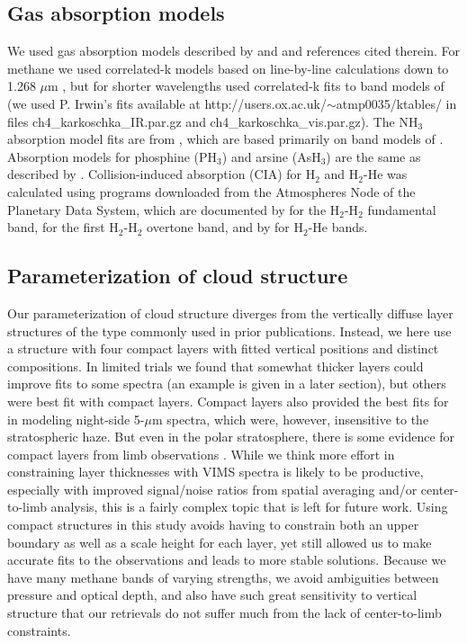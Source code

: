 \documentclass[article,11pt]{emulateapj}
\def\mum{$\mu$m }
\def\phtx{PH$_3$}
\def\nht{NH$_3$ }
\begin{document}
\subsection{Gas absorption models}
We used gas absorption models 
 described by \cite{Sro2018dark} and \cite{Sro2013gws}  and references cited therein.  For
methane we used correlated-k models
based on line-by-line calculations down to 1.268 \mum
\citep{Sro2012LBL}, but for shorter wavelengths used correlated-k fits
to band models of \cite{Kark2010ch4} (we used P. Irwin's fits
available at http://users.ox.ac.uk/$\sim$atmp0035/ktables/ in files
ch4\_karkoschka\_IR.par.gz and ch4\_karkoschka\_vis.par.gz).  The \nht
absorption model fits are from \cite{Sro2010iso}, which are based primarily on band models of
\cite{Bowles2008}.
Absorption models for phosphine (\phtx) and arsine
(AsH$_3$) are the same as described by \cite{Sro2013gws}.
Collision-induced absorption (CIA) for H$_2$ and H$_2$-He was
calculated using programs downloaded from the Atmospheres Node of the
Planetary Data System, which are documented by \cite{Borysow1991h2h2f,
  Borysow1993errat} for the H$_2$-H$_2$ fundamental band,
\cite{Zheng1995h2h2o1} for the first H$_2$-H$_2$ overtone band, and by
\cite{Borysow1992h2he} for H$_2$-He bands.

\subsection{Parameterization of cloud structure}\label{Sec:parcloud}

Our parameterization of cloud structure diverges from the 
 vertically diffuse layer structures of the type commonly
used in prior publications.  Instead, we here use a
structure with four compact layers with fitted vertical positions and
distinct compositions.  In limited trials we found
that somewhat thicker layers could improve fits to some spectra (an example is given
in a later section), but others were best fit with compact layers.
Compact layers also provided the best fits for \cite{Fletcher2011vims}
in modeling night-side 5-\mum spectra, which were, however,
insensitive to the stratospheric haze.    But even in the polar
stratosphere, there is some evidence for compact layers from limb
observations \citep{Sanchez-Lavega2020hazes}.  While we think more
effort in constraining layer thicknesses with VIMS spectra is likely
to be productive, especially with improved signal/noise ratios from
spatial averaging and/or center-to-limb analysis, this is a fairly
complex topic that is left for future work.  Using compact structures
in this study avoids having to constrain both an upper boundary as
well as a scale height for each layer, yet still allowed us to make
accurate fits to the observations and leads to more stable solutions.
Because we have many methane bands of varying strengths, we avoid
ambiguities between pressure and optical depth, and also have
such great sensitivity to vertical structure that our retrievals
do not suffer much from the lack of center-to-limb constraints.
\end{document}
